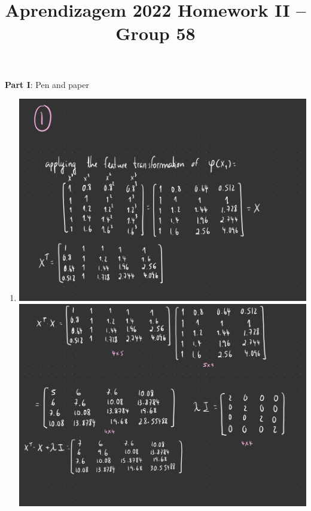 \documentclass[12pt]{article}
\title{\large{Aprendizagem 2022}\vskip 0.2cm Homework II -- Group 58}
\date{}
\begin{document}
\maketitle
\center\large{\vskip -2.5cm\textbf{Part I}: Pen and paper}
\begin{enumerate}[leftmargin=\labelsep]


\item \leavevmode\vadjust{\vspace{-\baselineskip}}
\begin{center}
\includegraphics[scale=0.2]{images/Project-31.jpg}
\newline
\includegraphics[scale=0.2]{images/Project-32.jpg}
\newline

\end{center}
\end{enumerate}
\end{document}
